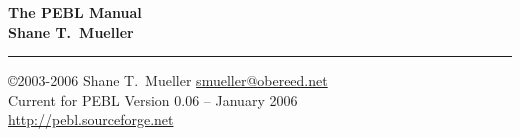 \documentclass[a4paper,11pt]{report}
\begin{document}
\begin{center}
\LARGE
\textbf{The PEBL Manual} \\
\vspace{0.7cm}\Large \textbf{Shane T.~Mueller}
\end{center}
\rule{\textwidth}{1mm}


\vspace{.4cm}
\normalsize
\noindent\copyright 2003-2006 Shane T.~Mueller \href{mailto:smueller@obereed.net}{smueller@obereed.net}\\
Current for PEBL Version 0.06 -- January 2006 \\
\href{http://pebl.sourceforge.net}{http://pebl.sourceforge.net}
\tableofcontents

\clearpage
{}








\appendix
%


%
%
\end{document}
